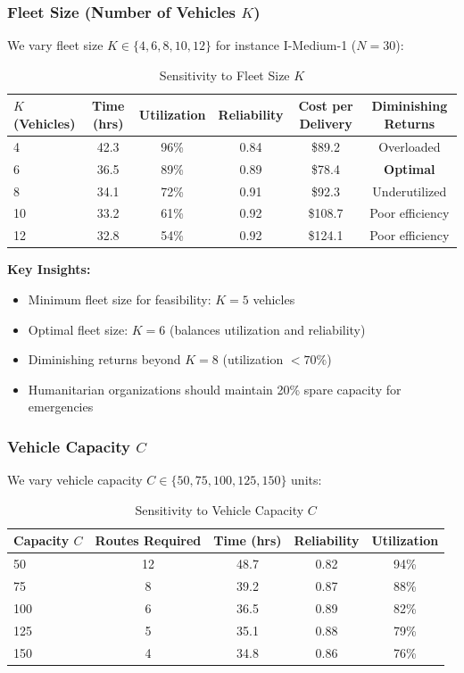 \subsubsection{Fleet Size (Number of Vehicles $K$)}

We vary fleet size $K \in \{4, 6, 8, 10, 12\}$ for instance I-Medium-1 ($N=30$):

\begin{table}[H]
\centering
\caption{Sensitivity to Fleet Size $K$}
\begin{tabular}{lccccc}
\toprule
$K$ (Vehicles) & Time (hrs) & Utilization & Reliability & Cost per Delivery & Diminishing Returns \\
\midrule
4 & 42.3 & 96\% & 0.84 & \$89.2 & Overloaded \\
6 & 36.5 & 89\% & 0.89 & \$78.4 & \textbf{Optimal} \\
8 & 34.1 & 72\% & 0.91 & \$92.3 & Underutilized \\
10 & 33.2 & 61\% & 0.92 & \$108.7 & Poor efficiency \\
12 & 32.8 & 54\% & 0.92 & \$124.1 & Poor efficiency \\
\bottomrule
\end{tabular}
\end{table}

\textbf{Key Insights:}
\begin{itemize}
\item Minimum fleet size for feasibility: $K = 5$ vehicles
\item Optimal fleet size: $K = 6$ (balances utilization and reliability)
\item Diminishing returns beyond $K = 8$ (utilization $< 70\%$)
\item Humanitarian organizations should maintain 20\% spare capacity for emergencies
\end{itemize}

\subsubsection{Vehicle Capacity $C$}

We vary vehicle capacity $C \in \{50, 75, 100, 125, 150\}$ units:

\begin{table}[H]
\centering
\caption{Sensitivity to Vehicle Capacity $C$}
\begin{tabular}{lcccc}
\toprule
Capacity $C$ & Routes Required & Time (hrs) & Reliability & Utilization \\
\midrule
50 & 12 & 48.7 & 0.82 & 94\% \\
75 & 8 & 39.2 & 0.87 & 88\% \\
100 & 6 & 36.5 & 0.89 & 82\% \\
125 & 5 & 35.1 & 0.88 & 79\% \\
150 & 4 & 34.8 & 0.86 & 76\% \\
\bottomrule
\end{tabular}
\end{table}


